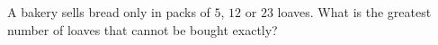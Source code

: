 A bakery sells bread only in packs of $5$, $12$ or $23$ loaves. What is the greatest number of loaves that cannot be bought exactly?

